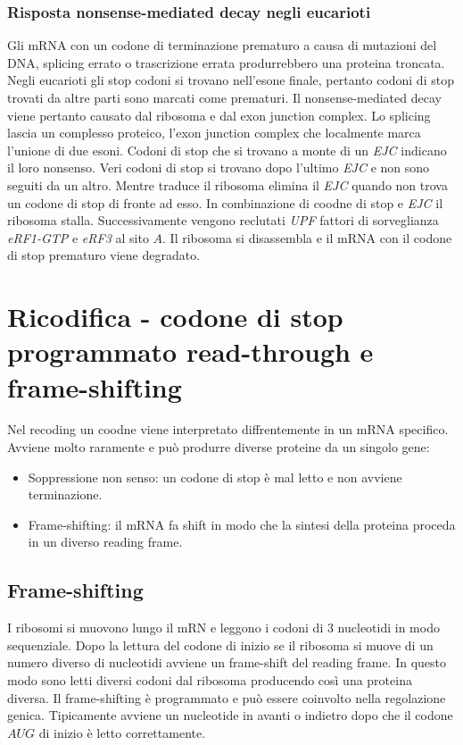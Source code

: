 \subsubsection{Risposta nonsense-mediated decay negli eucarioti}
Gli mRNA con un codone di terminazione prematuro a causa di mutazioni del DNA, splicing errato o trascrizione errata produrrebbero una proteina troncata. Negli eucarioti gli 
stop codoni si trovano nell'esone finale, pertanto codoni di stop trovati da altre parti sono marcati come prematuri. Il nonsense-mediated decay viene pertanto causato dal ribosoma
e dal exon junction complex. Lo splicing lascia un complesso proteico, l'exon junction complex che localmente marca l'unione di due esoni. Codoni di stop che si trovano a monte di un 
\emph{EJC} indicano il loro nonsenso. Veri codoni di stop si trovano dopo l'ultimo \emph{EJC} e non sono seguiti da un altro. Mentre traduce il ribosoma elimina il \emph{EJC} quando non 
trova un codone di stop di fronte ad esso. In combinazione di coodne di stop e \emph{EJC} il ribosoma stalla. Successivamente vengono reclutati \emph{UPF} fattori di sorveglianza 
\emph{eRF1-GTP} e \emph{eRF3} al sito $A$. Il ribosoma si disassembla e il mRNA con il codone di stop prematuro viene degradato. 
\section{Ricodifica - codone di stop programmato read-through e frame-shifting}
Nel recoding un coodne viene interpretato diffrentemente in un mRNA specifico. Avviene molto raramente e pu\`o produrre diverse proteine da un singolo gene:
\begin{itemize}
	\item Soppressione non senso: un codone di stop \`e mal letto e non avviene terminazione.
	\item Frame-shifting: il mRNA fa shift in modo che la sintesi della proteina proceda in un diverso reading frame. 
\end{itemize}
\subsection{Frame-shifting}
I ribosomi si muovono lungo il mRN e leggono i codoni di $3$ nucleotidi in modo sequenziale. Dopo la lettura del codone di inizio se il ribosoma si muove di un numero diverso di 
nucleotidi avviene un frame-shift del reading frame. In questo modo sono letti diversi codoni dal ribosoma producendo cos\`i una proteina diversa. Il frame-shifting \`e programmato
e pu\`o essere coinvolto nella regolazione genica. Tipicamente avviene un nucleotide in avanti o indietro dopo che il codone $AUG$ di inizio \`e letto correttamente.
